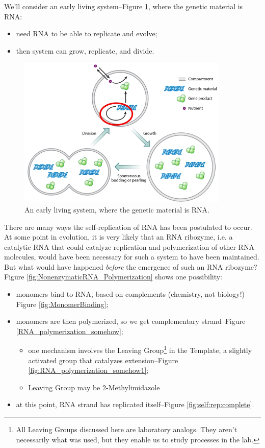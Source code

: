 \documentclass[]{article}
\begin{document}
We'll consider an early living system--Figure \ref{fig:RNA_WorldTheory1}, where the genetic material is RNA:
\begin{itemize}
	\item need RNA to be able to replicate and evolve;
	\item then system can grow, replicate, and divide.
\end{itemize}
 

\begin{figure}[H]
	\caption[An early living system, where the genetic material is RNA.]{An early living system, where the genetic material is RNA\cite{blain2014progress}.}\label{fig:RNA_WorldTheory1}
	\includegraphics[width=0.9\textwidth]{RNA_WorldTheory1}
\end{figure}

There are many ways the self-replication of RNA has been postulated to occur. At some point in evolution, it is very likely that an RNA ribozyme, i.e. a catalytic RNA that could catalyze replication and polymerization of other RNA molecules, would have been necessary for such a system to have been maintained. But what would have happened \emph{before} the emergence of such an RNA ribozyme? Figure \ref{fig:NonenzymaticRNA_Polymerization} shows one possibility:

\begin{itemize}
	\item monomers bind to RNA, based on complements (chemistry, not biology!)--Figure \ref{fig:MonomerBinding};
	\item monomers are then polymerized, so we get complementary strand--Figure \ref{RNA_polymerization_somehow};
	\begin{itemize}
		\item one mechanism involves the Leaving Group\footnote{All Leaving Groups discussed here are laboratory analogs. They aren't necessarily what was used, but they enable us to study processes in the lab.} in the Template, a slightly activated group that catalyzes extension--Figure \ref{fig:RNA_polymerization_somehow1};
		\item Leaving Group may be 2-Methylimidazole
	\end{itemize} 
	\item at this point, RNA strand has replicated itself--Figure \ref{fig:self:rep:complete}.
\end{itemize}
\end{document}
